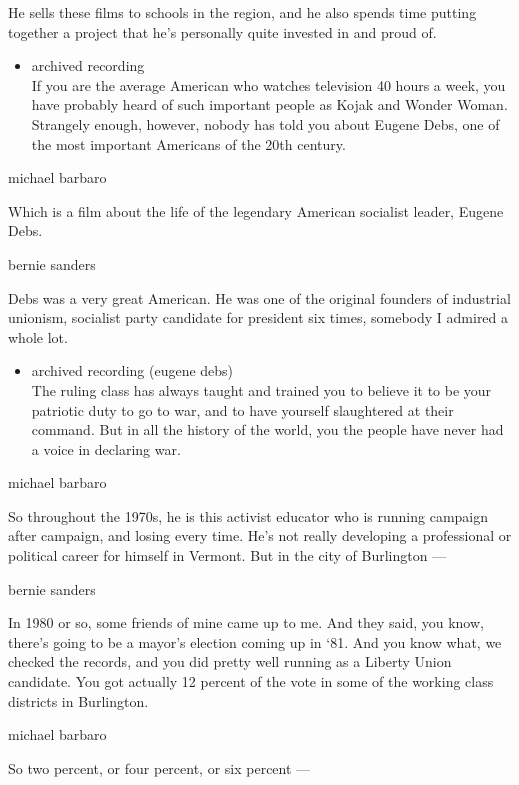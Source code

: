 He sells these films to schools in the region, and he also spends time
putting together a project that he's personally quite invested in and
proud of.

\begin{itemize}
\tightlist
\item
  archived recording\\
  If you are the average American who watches television 40 hours a
  week, you have probably heard of such important people as Kojak and
  Wonder Woman. Strangely enough, however, nobody has told you about
  Eugene Debs, one of the most important Americans of the 20th century.
\end{itemize}

michael barbaro

Which is a film about the life of the legendary American socialist
leader, Eugene Debs.

bernie sanders

Debs was a very great American. He was one of the original founders of
industrial unionism, socialist party candidate for president six times,
somebody I admired a whole lot.

\begin{itemize}
\tightlist
\item
  archived recording (eugene debs)\\
  The ruling class has always taught and trained you to believe it to be
  your patriotic duty to go to war, and to have yourself slaughtered at
  their command. But in all the history of the world, you the people
  have never had a voice in declaring war.
\end{itemize}

michael barbaro

So throughout the 1970s, he is this activist educator who is running
campaign after campaign, and losing every time. He's not really
developing a professional or political career for himself in Vermont.
But in the city of Burlington ---

bernie sanders

In 1980 or so, some friends of mine came up to me. And they said, you
know, there's going to be a mayor's election coming up in `81. And you
know what, we checked the records, and you did pretty well running as a
Liberty Union candidate. You got actually 12 percent of the vote in some
of the working class districts in Burlington.

michael barbaro

So two percent, or four percent, or six percent ---

